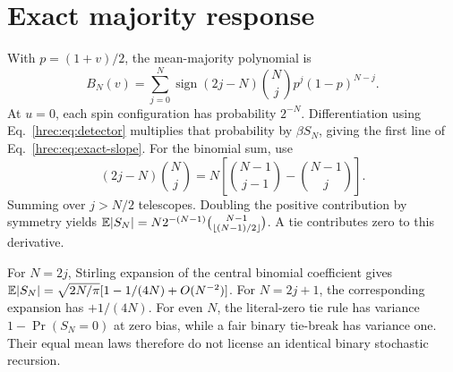 \section{Exact majority response}
\label{hrec:app:majority}
With \(p=(1+v)/2\), the mean-majority polynomial is
\begin{equation}
 B_N(v)=\sum_{j=0}^N
 \operatorname{sign}(2j-N)\binom Nj p^j(1-p)^{N-j}.
\end{equation}
At \(u=0\), each spin configuration has probability \(2^{-N}\). Differentiation using Eq.~\eqref{hrec:eq:detector} multiplies that probability by \(\beta S_N\), giving the first line of Eq.~\eqref{hrec:eq:exact-slope}. For the binomial sum, use
\[
 (2j-N)\binom Nj
 =N\left[\binom{N-1}{j-1}-\binom{N-1}j\right].
\]
Summing over \(j>N/2\) telescopes. Doubling the positive contribution by symmetry yields
\(\mathbb E|S_N|=N2^{-(N-1)}\binom{N-1}{\lfloor(N-1)/2\rfloor}\).
A tie contributes zero to this derivative.

For \(N=2j\), Stirling expansion of the central binomial coefficient gives
\(\mathbb E|S_N|=\sqrt{2N/\pi}[1-1/(4N)+O(N^{-2})]\).
For \(N=2j+1\), the corresponding expansion has \(+1/(4N)\).
For even \(N\), the literal-zero tie rule has variance
\(1-\Pr(S_N=0)\) at zero bias, while a fair binary tie-break has variance one. Their equal mean laws therefore do not license an identical binary stochastic recursion.

